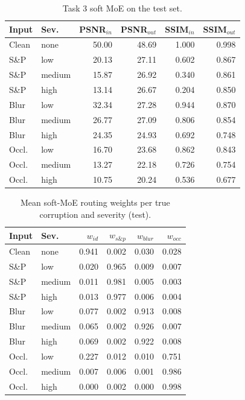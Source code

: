 \documentclass[conference]{IEEEtran}
\begin{document}
\begin{table}[t]\centering\caption{Task 3 soft MoE on the test set.}\label{tab:t3}\setlength{\tabcolsep}{4pt}
\begin{tabular}{llrrrr}\toprule
Input & Sev. & PSNR$_{in}$ & PSNR$_{out}$ & SSIM$_{in}$ & SSIM$_{out}$\\ \midrule
Clean & none & 50.00 & 48.69 & 1.000 & 0.998 \\
S\&P & low & 20.13 & 27.11 & 0.602 & 0.867 \\
S\&P & medium & 15.87 & 26.92 & 0.340 & 0.861 \\
S\&P & high & 13.14 & 26.67 & 0.204 & 0.850 \\
Blur & low & 32.34 & 27.28 & 0.944 & 0.870 \\
Blur & medium & 26.77 & 27.09 & 0.806 & 0.854 \\
Blur & high & 24.35 & 24.93 & 0.692 & 0.748 \\
Occl. & low & 16.70 & 23.68 & 0.862 & 0.843 \\
Occl. & medium & 13.27 & 22.18 & 0.726 & 0.754 \\
Occl. & high & 10.75 & 20.24 & 0.536 & 0.677 \\
\bottomrule\end{tabular}\end{table}
\begin{table}[t]\centering\caption{Mean soft-MoE routing weights per true corruption and severity (test).}\label{tab:t3w}\setlength{\tabcolsep}{4pt}
\begin{tabular}{llrrrr}\toprule
Input & Sev. & $w_{id}$ & $w_{s\&p}$ & $w_{blur}$ & $w_{occ}$\\ \midrule
Clean & none & 0.941 & 0.002 & 0.030 & 0.028 \\
S\&P & low & 0.020 & 0.965 & 0.009 & 0.007 \\
S\&P & medium & 0.011 & 0.981 & 0.005 & 0.003 \\
S\&P & high & 0.013 & 0.977 & 0.006 & 0.004 \\
Blur & low & 0.077 & 0.002 & 0.913 & 0.008 \\
Blur & medium & 0.065 & 0.002 & 0.926 & 0.007 \\
Blur & high & 0.069 & 0.002 & 0.922 & 0.008 \\
Occl. & low & 0.227 & 0.012 & 0.010 & 0.751 \\
Occl. & medium & 0.007 & 0.006 & 0.001 & 0.986 \\
Occl. & high & 0.000 & 0.002 & 0.000 & 0.998 \\
\bottomrule\end{tabular}\end{table}
\end{document}
